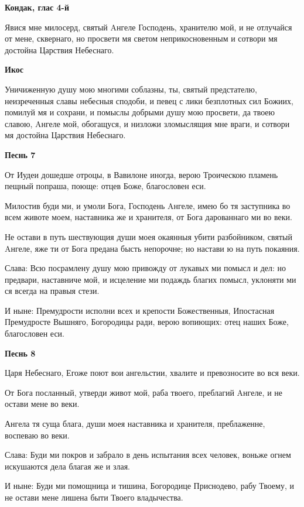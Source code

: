 \medskip
\bfseries Кондак, глас 4-й\normalfont{}


  Явися мне милосерд, святый Aнгеле Господень, хранителю мой, и не отлучайся от мене, сквернаго, но просвети мя светом неприкосновенным и сотвори мя достойна Царствия Небеснаго.




\medskip
\bfseries Икос\normalfont{}


  Уничиженную душу мою многими соблазны, ты, святый предстателю, неизреченныя славы небесныя сподоби, и певец с лики безплотных сил Божиих, помилуй мя и сохрани, и помыслы добрыми душу мою просвети, да твоею славою, Aнгеле мой, обогащуся, и низложи зломыслящия мне враги, и сотвори мя достойна Царствия Небеснаго.




\medskip
\bfseries Песнь 7\normalfont{}


  От Иудеи дошедше отроцы, в Вавилоне иногда, верою Троическою пламень пещный попраша, поюще: отцев Боже, благословен еси.


  Милостив буди ми, и умоли Бога, Господень Aнгеле, имею бо тя заступника во всем животе моем, наставника же и хранителя, от Бога дарованнаго ми во веки.


  Не остави в путь шествующия души моея окаянныя убити разбойником, святый Aнгеле, яже ти от Бога предана бысть непорочне; но настави ю на путь покаяния.


  Слава: Всю посрамлену душу мою привожду от лукавых ми помысл и дел: но предвари, наставниче мой, и исцеление ми подаждь благих помысл, уклоняти ми ся всегда на правыя стези.


  И ныне: Премудрости исполни всех и крепости Божественныя, Ипостасная Премудросте Вышняго, Богородицы ради, верою вопиющих: отец наших Боже, благословен еси.




\medskip
\bfseries Песнь 8\normalfont{}


  Царя Небеснаго, Егоже поют вои ангельстии, хвалите и превозносите во вся веки.


  От Бога посланный, утверди живот мой, раба твоего, преблагий Aнгеле, и не остави мене во веки.


  Ангела тя суща блага, души моея наставника и хранителя, преблаженне, воспеваю во веки.


  Слава: Буди ми покров и забрало в день испытания всех человек, воньже огнем искушаются дела благая же и злая.


  И ныне: Буди ми помощница и тишина, Богородице Приснодево, рабу Твоему, и не остави мене лишена быти Твоего владычества.





